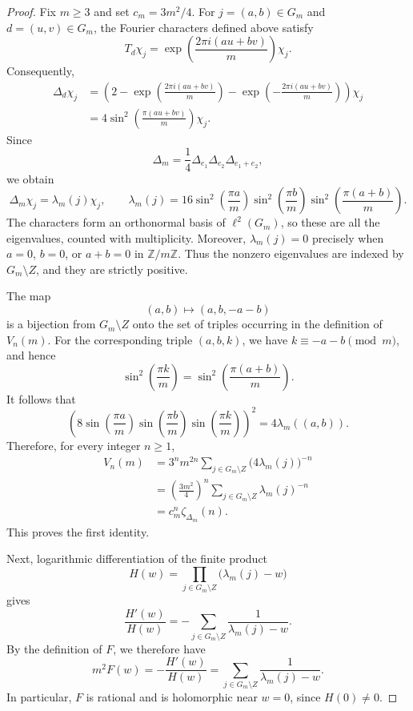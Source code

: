 \documentclass[11pt,reqno]{amsart}
\theoremstyle{remark}
\begin{document}
\begin{proof}
Fix \(m\geq 3\) and set \(c_m=3m^2/4\).
For \(j=(a,b)\in G_m\) and \(d=(u,v)\in G_m\), the Fourier
characters defined above satisfy
\[
T_d\chi_j
=
\exp\!\left(\frac{2\pi i(au+bv)}{m}\right)\chi_j.
\]
Consequently,
\begin{align*}
\Delta_d\chi_j
&=
\left(
2-\exp\left(\frac{2\pi i(au+bv)}{m}\right)
 -\exp\left(-\frac{2\pi i(au+bv)}{m}\right)
\right)\chi_j \\
&=
4\sin^2\left(\frac{\pi(au+bv)}{m}\right)\chi_j.
\end{align*}
Since
\[
\Delta_m=\frac14\Delta_{e_1}\Delta_{e_2}\Delta_{e_1+e_2},
\]
we obtain
\[
\Delta_m\chi_j=\lambda_m(j)\chi_j,
\qquad
\lambda_m(j)
=
16\sin^2\left(\frac{\pi a}{m}\right)
  \sin^2\left(\frac{\pi b}{m}\right)
  \sin^2\left(\frac{\pi(a+b)}{m}\right).
\]
The characters form an orthonormal basis of \(\ell^2(G_m)\),
so these are all the eigenvalues, counted with multiplicity.
Moreover, \(\lambda_m(j)=0\) precisely when
\(a=0\), \(b=0\), or \(a+b=0\) in \(\mathbb Z/m\mathbb Z\).
Thus the nonzero eigenvalues are indexed by \(G_m\setminus Z\),
and they are strictly positive.

The map
\[
(a,b)\longmapsto(a,b,-a-b)
\]
is a bijection from \(G_m\setminus Z\) onto the set of triples
occurring in the definition of \(V_n(m)\).
For the corresponding triple \((a,b,k)\), we have
\(k\equiv-a-b\pmod m\), and hence
\[
\sin^2\left(\frac{\pi k}{m}\right)
=
\sin^2\left(\frac{\pi(a+b)}{m}\right).
\]
It follows that
\[
\left(
8\sin\left(\frac{\pi a}{m}\right)
 \sin\left(\frac{\pi b}{m}\right)
 \sin\left(\frac{\pi k}{m}\right)
\right)^2
=
4\lambda_m((a,b)).
\]
Therefore, for every integer \(n\geq 1\),
\begin{align*}
V_n(m)
&=
3^n m^{2n}
\sum_{j\in G_m\setminus Z}
\bigl(4\lambda_m(j)\bigr)^{-n} \\
&=
\left(\frac{3m^2}{4}\right)^n
\sum_{j\in G_m\setminus Z}\lambda_m(j)^{-n} \\
&=
c_m^n\zeta_{\Delta_m}(n).
\end{align*}
This proves the first identity.

Next, logarithmic differentiation of the finite product
\[
H(w)=\prod_{j\in G_m\setminus Z}\bigl(\lambda_m(j)-w\bigr)
\]
gives
\[
\frac{H'(w)}{H(w)}
=
-\sum_{j\in G_m\setminus Z}
\frac{1}{\lambda_m(j)-w}.
\]
By the definition of \(F\), we therefore have
\[
m^2F(w)
=
-\frac{H'(w)}{H(w)}
=
\sum_{j\in G_m\setminus Z}
\frac{1}{\lambda_m(j)-w}.
\]
In particular, \(F\) is rational and is holomorphic near \(w=0\),
since \(H(0)\neq 0\).


\end{proof}
\end{document}
